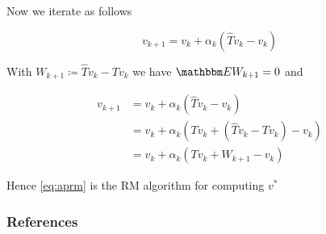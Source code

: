 \documentclass[xcolor=dvipsnames]{beamer}  %
\newcommand{\1}{\mathbbm 1}
\newcommand{\EE}{\mathbbm E}
\begin{document}
\begin{frame}
    
    Now we iterate as follows

    \begin{equation}\label{eq:aprm}
        v_{k+1} = v_k + \alpha_k (\hat T v_k - v_k)
    \end{equation}

    With $W_{k+1} \coloneq \hat Tv_k - Tv_k$ we have $\EE W_{k+1} = 0$ and

    \begin{align*}
        v_{k+1} 
        & = v_k + \alpha_k (\hat T v_k - v_k)
        \\
        & = v_k + \alpha_k (Tv_k + (\hat T v_k - Tv_k) - v_k)
        \\
        & = v_k + \alpha_k (Tv_k + W_{k+1} - v_k)
    \end{align*}


    Hence \eqref{eq:aprm} is the RM algorithm for computing $v^*$

\end{frame}


\begin{frame}[allowframebreaks]
    \frametitle{References}

    

    

\end{frame}
\end{document}
